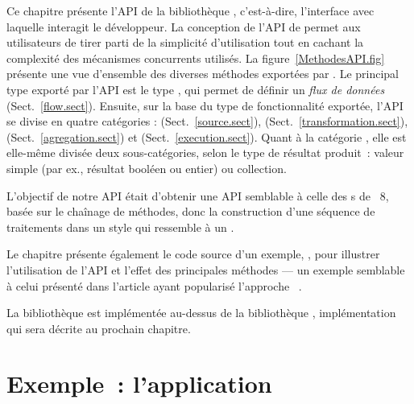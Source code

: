 Ce chapitre pr\'esente l'API de la biblioth\`eque \ppff,  c'est-\`a-dire, l'interface avec laquelle interagit le d\'eveloppeur. La conception de l'API de \ppff{} permet aux utilisateurs de tirer parti de la simplicit\'e d'utilisation tout en cachant la complexit\'e des m\'ecanismes concurrents utilis\'es. La figure~\ref{MethodesAPI.fig} pr\'esente une vue d'ensemble des diverses m\'ethodes export\'ees par \ppff.
%
Le principal type exporté par l'API est le type , qui permet de définir un \emph{flux de données} (Sect.~\ref{flow.sect}).
%
Ensuite, sur la base du type de fonctionnalit\'e export\'ee, l'API se divise en quatre cat\'egories :   (Sect.~\ref{source.sect}),  (Sect.~\ref{transformation.sect}),   (Sect.~\ref{agregation.sect}) et  (Sect.~\ref{execution.sect}). Quant \`a la cat\'egorie , elle est elle-m\^eme divis\'ee deux sous-cat\'egories, selon le type de r\'esultat produit~: valeur simple (par ex., r\'esultat bool\'een ou entier) ou collection.

L'objectif de notre API \'etait d'obtenir une API semblable \`a celle des s de ~8, bas\'ee sur le cha\^inage de m\'ethodes, donc la construction d'une séquence de traitements dans un style qui ressemble \`a un .


Le chapitre pr\'esente \'egalement le code source d'un exemple, , pour illustrer l'utilisation de l'API et l'effet des principales m\'ethodes --- un exemple semblable à celui présenté dans l'article ayant popularisé l'approche ~\citep{DeanGhe04}.

La biblioth\`eque \PpFf{} est impl\'ement\'ee au-dessus de la biblioth\`eque , impl\'ementation qui sera d\'ecrite au prochain chapitre.




\section{Exemple~: l'application }
\label{descriptionWordCount.sect}



